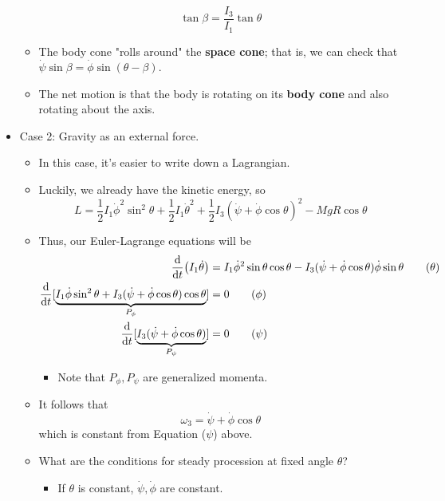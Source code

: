 \documentclass[../notes.tex]{subfiles}
\begin{document}
\begin{itemize}
\begin{itemize}
\begin{equation*}
            \tan\beta = \frac{I_3}{I_1}\tan\theta
        \end{equation*}
        \item The body cone "rolls around" the \textbf{space cone}; that is, we can check that $\dot{\psi}\sin\beta=\dot{\phi}\sin(\theta-\beta)$.
        \item The net motion is that the body is rotating on its \textbf{body cone} and also rotating about the axis.
    \end{itemize}
    \item Case 2: Gravity as an external force.
    \begin{itemize}
        \item In this case, it's easier to write down a Lagrangian.
        \item Luckily, we already have the kinetic energy, so
        \begin{equation*}
            L = \frac{1}{2}I_1\dot{\phi}^2\sin^2\theta+\frac{1}{2}I_1\dot{\theta}^2+\frac{1}{2}I_3(\dot{\psi}+\dot{\phi}\cos\theta)^2-MgR\cos\theta
        \end{equation*}
        \item Thus, our Euler-Lagrange equations will be
        \begin{align*}
            \dv{t}(I_1\dot{\theta}) &= I_1\dot{\phi}^2\sin\theta\cos\theta-I_3(\dot{\psi}+\dot{\phi}\cos\theta)\dot{\phi}\sin\theta\tag{$\theta$}\\
            \dv{t}[\underbrace{I_1\dot{\phi}\sin^2\theta+I_3(\dot{\psi}+\dot{\phi}\cos\theta)\cos\theta}_{P_\phi}] &= 0\tag{$\phi$}\\
            \dv{t}[\underbrace{I_3(\dot{\psi}+\dot{\phi}\cos\theta)}_{P_\psi}] &= 0\tag{$\psi$}
        \end{align*}
        \begin{itemize}
            \item Note that $P_\phi,P_\psi$ are generalized momenta.
        \end{itemize}
        \item It follows that
        \begin{equation*}
            \omega_3 = \dot{\psi}+\dot{\phi}\cos\theta
        \end{equation*}
        which is constant from Equation ($\psi$) above.
        \item What are the conditions for steady procession at fixed angle $\theta$?
        \begin{itemize}
            \item If $\theta$ is constant, $\dot{\psi},\dot{\phi}$ are constant.

\end{itemize}
\end{itemize}
\end{itemize}
\end{document}

